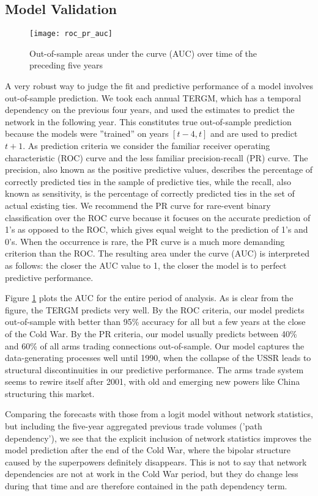 \documentclass[12pt, letterpaper]{article}
\numberwithin{equation}{section}
\begin{document}
\subsection{Model Validation}
\begin{figure}[t]
\begin{center}
\texttt{[image: roc\_pr\_auc]}
\caption{Out-of-sample areas under the curve (AUC) over time of the preceding five years}
\label{auc}
\end{center}
\end{figure}
A very robust way to judge the fit and predictive performance of a model involves out-of-sample prediction. 
We took each annual TERGM, which has a temporal dependency on the previous four years, and used the estimates to predict the network in the following year. 
This constitutes true out-of-sample prediction because the models were ''trained'' on years $[t-4, t]$ and are used to predict $t+1$. As prediction criteria we consider the familiar receiver operating characteristic (ROC) curve and the less familiar precision-recall (PR) curve. The precision, also known as the positive predictive values, describes the percentage of correctly predicted ties in the sample of predictive ties, while the recall, also known as sensitivity, is the percentage of correctly predicted ties in the set of actual existing ties. We recommend the PR curve for rare-event binary classification over the ROC curve because it focuses on the accurate prediction of 1's as opposed to the ROC, which gives equal weight to the prediction of 1's and 0's. When the occurrence is rare, the PR curve is a much more demanding criterion than the ROC.
The resulting area under the curve (AUC) is interpreted as follows: the closer the AUC value to 1, the closer the model is to perfect predictive performance. 

Figure \ref{auc} plots the AUC for the entire period of analysis. 
As is clear from the figure, the TERGM predicts very well. 
By the ROC criteria, our model predicts out-of-sample with better than 95\% accuracy for all but a few years at the close of the Cold War. 
By the PR criteria, our model usually predicts between 40\% and 60\% of all arms trading connections out-of-sample.
Our model captures the data-generating processes well until 1990, when the collapse of the USSR leads to structural discontinuities in our predictive performance. The arms trade system seems to rewire itself after 2001, with old and emerging new powers like China structuring this market.    


Comparing the forecasts with those from a logit model without network statistics, but including the five-year aggregated previous trade volumes ('path dependency'), we see that the explicit inclusion of network statistics improves the model prediction after the end of the Cold War, where the bipolar structure caused by the superpowers definitely disappears. This is not to say that network dependencies are not at work in the Cold War period, but they do change less during that time and are therefore contained in the path dependency term. 
 
\end{document}
